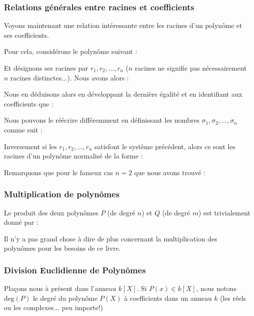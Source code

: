 	\pagebreak
	\subsubsection{Relations générales entre racines et coefficients}
	Voyons maintenant une relation intéressante entre les racines d'un polynôme et ses coefficients.

	Pour cela, considérons le polynôme suivant :
	
	Et désignons ses racines par $r_1,r_2,\ldots,r_n$ ($n$ racines ne signifie pas nécessairement $n$ racines distinctes...). Nous avons alors :
	
	Nous en déduisons alors en développant la dernière égalité et en identifiant aux coefficients que :
	
	Nous pouvons le réécrire différemment en définissant les nombres $\sigma_1,\sigma_2,\ldots,\sigma_n$ comme suit :
	
	Inversement si les $r_1,r_2,\ldots,r_n$ satisfont le système précédent, alors ce sont les racines d'un polynôme normalisé de la forme :
	
	Remarquons que pour le fameux cas $n=2$ que nous avons trouvé :
	
	
	
	\subsubsection{Multiplication de polynômes}\label{polynomials multiplication}
	Le produit des deux polynômes $P$ (de degré $n$) et $Q$ (de degré $m$) est trivialement donné par :
	
	Il n'y a pas grand chose à dire de plus concernant la multiplication des polynômes pour les besoins de ce livre.
	
	\subsubsection{Division Euclidienne de Polynômes}\label{polynomials division}
	Plaçons nous à présent dans l'anneau $k[X]$. Si $P(x)\in k[X]$, nous notons $\text{deg}(P)$ le degré du polynôme $P(X)$ à coefficients dans un anneau $k$ (les réels ou les complexes... peu importe!)

